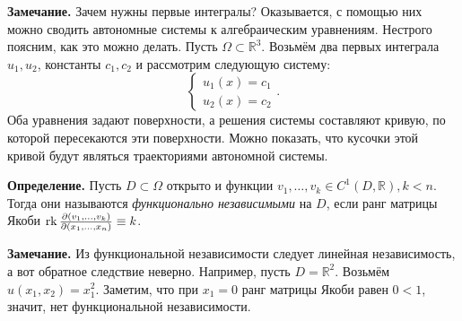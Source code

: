 \textbf{Замечание.} Зачем нужны первые интегралы? Оказывается, с помощью них можно сводить автономные системы к алгебраическим уравнениям. Нестрого поясним, как это можно делать. Пусть $\Omega \subset \mathbb{R}^3$.
Возьмём два первых интеграла $u_1, u_2$, константы $c_1, c_2$ и рассмотрим следующую систему:
\[
    \begin{cases}
        u_1(x) = c_1\\
        u_2(x) = c_2
    \end{cases}.
\]
Оба уравнения задают поверхности, а решения системы составляют кривую, по которой пересекаются эти поверхности. Можно показать, что кусочки этой кривой будут являться траекториями автономной системы.

\textbf{Определение.} Пусть $D \subset \Omega$ открыто и функции $v_1, \dots, v_k \in C^1(D, \mathbb{R}), k < n$.
Тогда они называются \textit{функционально независимыми} на $D$, если ранг матрицы Якоби $\operatorname{rk} \frac{\partial(v_1, \dots, v_k)}{\partial(x_1, \dots, x_n)} \equiv k$.

\textbf{Замечание.} Из функциональной независимости следует линейная независимость, а вот обратное следствие неверно. Например, пусть $D = \mathbb{R}^2$. Возьмём $u(x_1, x_2) = x_1^2$. Заметим, что при $x_1 = 0$ ранг матрицы Якоби равен $0 < 1$, значит, нет функциональной независимости.



